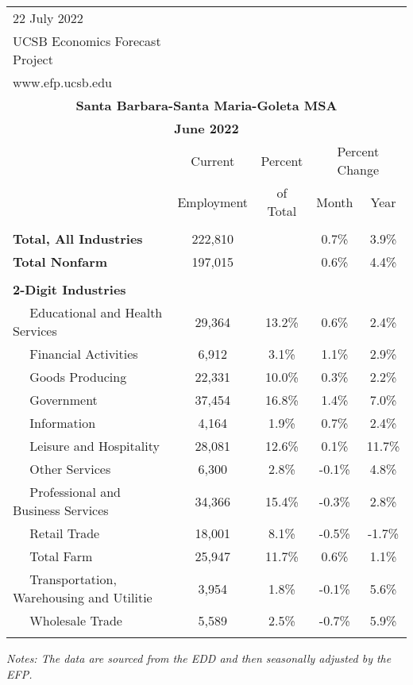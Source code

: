 \documentclass[12pt]{article}
\begin{document}
\begin{landscape}
\begin{table}
\begin{tabular}{|l|c|c|c|c|}
\multicolumn{1}{l}{\small 22 July 2022} & \multicolumn{4}{c}{} \\
\multicolumn{1}{l}{\small UCSB Economics Forecast Project} & \multicolumn{4}{c}{} \\
\multicolumn{1}{l}{\small www.efp.ucsb.edu} & \multicolumn{4}{c}{} \\
\multicolumn{5}{c}{\large \textbf{Santa Barbara-Santa Maria-Goleta MSA}} \\
\multicolumn{5}{c}{\large \textbf{June 2022}} \
\multicolumn{5}{l}{\small Data Seasonally Adjusted} \\ \hline \hline
& Current & Percent & \multicolumn{2}{c}{Percent Change} \vline \\
& Employment & of Total & Month & Year \\ \hline
&&&& \\
\textbf{Total, All Industries} & 222,810 && 0.7\% & 3.9\% \\
\textbf{Total Nonfarm} & 197,015 && 0.6\% & 4.4\% \\
&&&& \\
\textbf{2-Digit Industries} &&&& \\
$\quad$ Educational and Health Services & 29,364 & 13.2\% & 0.6\% & 2.4\% \\
$\quad$ Financial Activities & 6,912 & 3.1\% & 1.1\% & 2.9\% \\
$\quad$ Goods Producing & 22,331 & 10.0\% & 0.3\% & 2.2\% \\
$\quad$ Government & 37,454 & 16.8\% & 1.4\% & 7.0\% \\
$\quad$ Information & 4,164 & 1.9\% & 0.7\% & 2.4\% \\
$\quad$ Leisure and Hospitality & 28,081 & 12.6\% & 0.1\% & 11.7\% \\
$\quad$ Other Services & 6,300 & 2.8\% & -0.1\% & 4.8\% \\
$\quad$ Professional and Business Services & 34,366 & 15.4\% & -0.3\% & 2.8\% \\
$\quad$ Retail Trade & 18,001 & 8.1\% & -0.5\% & -1.7\% \\
$\quad$ Total Farm & 25,947 & 11.7\% & 0.6\% & 1.1\% \\
$\quad$ Transportation, Warehousing and Utilitie & 3,954 & 1.8\% & -0.1\% & 5.6\% \\
$\quad$ Wholesale Trade & 5,589 & 2.5\% & -0.7\% & 5.9\% \\
&&&& \\ \hline \hline
\end{tabular}
\par
\vspace{.5em}
\footnotesize
\textit{Notes: The data are sourced from the EDD and then seasonally adjusted by the EFP.}
\end{table}
\end{landscape}
\end{document}
